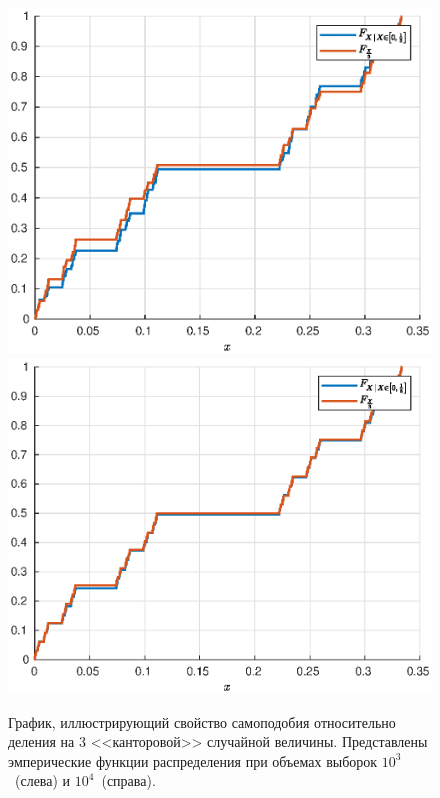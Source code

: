 \begin{figure}[t]
        \includegraphics[width=0.5\linewidth]{task_02/sam-1000.eps}
        \includegraphics[width=0.5\linewidth]{task_02/sam-10000.eps}
        \caption{График, иллюстрирующий свойство самоподобия относительно деления на 3 <<канторовой>> случайной величины. Представлены эмперические функции распределения при объемах выборок $10^3$~(слева) и $10^4$~(справа).}
\end{figure}

